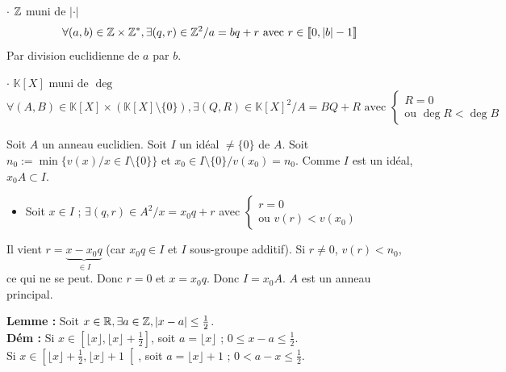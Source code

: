 \begin{solution}
$\cdot$ $\mathbb Z$ muni de $|\cdot|$
\[ \forall (a,b) \in \mathbb Z \times \mathbb Z^*, \exists (q,r) \in \mathbb Z^2 / a = bq + r \text{ avec } r \in \llbracket 0, |b|-1 \rrbracket \]
Par division euclidienne de $a$ par $b$.

$\cdot$ $\mathbb{K}[X]$ muni de $\deg$
\[ \forall (A,B) \in \mathbb{K}[X] \times (\mathbb{K}[X] \setminus \{0\}), \exists (Q,R) \in \mathbb{K}[X]^2 / A = BQ + R \text{ avec } \begin{cases} R = 0 \\ \text{ou } \deg R < \deg B \end{cases} \]

Soit $A$ un anneau euclidien.
Soit $I$ un idéal $\neq \{0\}$ de $A$.
Soit $n_0 := \min \{v(x) / x \in I \setminus \{0\}\}$ et $x_0 \in I \setminus \{0\} / v(x_0) = n_0$.
Comme $I$ est un idéal, $x_0 A \subset I$.
\begin{itemize}
  \item Soit $x \in I$ ; $\exists (q,r) \in A^2 / x = x_0 q + r$ avec $\begin{cases} r = 0 \\ \text{ou } v(r) < v(x_0) \end{cases}$
\end{itemize}
Il vient $r = \underbrace{x - x_0 q}_{\in I}$ (car $x_0 q \in I$ et $I$ sous-groupe additif).
Si $r \neq 0$, $v(r) < n_0$, ce qui ne se peut.
Donc $r = 0$ et $x = x_0 q$. Donc $I = x_0 A$.
$A$ est un anneau principal.

\textbf{Lemme :} Soit $x \in \mathbb R, \exists a \in \mathbb Z, |x-a| \leq \frac{1}{2}$. \\
\textbf{Dém :} Si $x \in \left[\lfloor x \rfloor, \lfloor x \rfloor + \frac{1}{2}\right]$, soit $a = \lfloor x \rfloor$ ; $0 \leq x - a \leq \frac{1}{2}$. \\
Si $x \in \left[\lfloor x \rfloor + \frac{1}{2}, \lfloor x \rfloor + 1\right[$, soit $a = \lfloor x \rfloor + 1$ ; $0 < a - x \leq \frac{1}{2}$.

\begin{center}
\end{center}
\end{solution}

